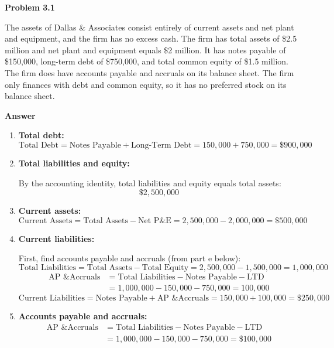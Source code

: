 \documentclass[11pt]{article}
\begin{document}
\textbf{Problem 3.1}
\bigskip

The assets of Dallas \& Associates consist entirely of current assets and net plant and equipment, and the firm has no excess cash. The firm has total assets of \$2.5 million and net plant and equipment equals \$2 million. It has notes payable of \$150,000, long-term debt of \$750,000, and total common equity of \$1.5 million. The firm does have accounts payable and accruals on its balance sheet. The firm only finances with debt and common equity, so it has no preferred stock on its balance sheet.

\bigskip
\textbf{Answer}

\begin{enumerate}
  \item[a.] \textbf{Total debt:}
    \[
      \text{Total Debt} = \text{Notes Payable} + \text{Long-Term Debt} = 150{,}000 + 750{,}000 = \boxed{\$900{,}000}
    \]

  \item[b.] \textbf{Total liabilities and equity:}

    By the accounting identity, total liabilities and equity equals total assets:
    \[
      \boxed{\$2{,}500{,}000}
    \]

  \item[c.] \textbf{Current assets:}
    \[
      \text{Current Assets} = \text{Total Assets} - \text{Net P\&E} = 2{,}500{,}000 - 2{,}000{,}000 = \boxed{\$500{,}000}
    \]

  \item[d.] \textbf{Current liabilities:}

    First, find accounts payable and accruals (from part e below):
    \[
      \text{Total Liabilities} = \text{Total Assets} - \text{Total Equity} = 2{,}500{,}000 - 1{,}500{,}000 = 1{,}000{,}000
    \]
    \begin{align*}
      \text{AP \& Accruals} &= \text{Total Liabilities} - \text{Notes Payable} - \text{LTD} \\
                            &= 1{,}000{,}000 - 150{,}000 - 750{,}000 = 100{,}000
    \end{align*}
    \[
      \text{Current Liabilities} = \text{Notes Payable} + \text{AP \& Accruals} = 150{,}000 + 100{,}000 = \boxed{\$250{,}000}
    \]

  \item[e.] \textbf{Accounts payable and accruals:}
    \begin{align*}
      \text{AP \& Accruals} &= \text{Total Liabilities} - \text{Notes Payable} - \text{LTD} \\
                            &= 1{,}000{,}000 - 150{,}000 - 750{,}000 = \boxed{\$100{,}000}
    \end{align*}


\end{enumerate}
\end{document}
